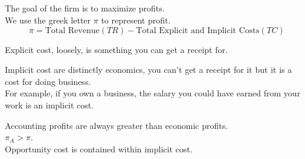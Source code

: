 \subsection{}
The goal of the firm is to maximize profits.\\
We use the greek letter $\pi$ to represent profit.
\begin{equation}
    \pi = \text{Total Revenue}(TR) - \text{Total Explicit and Implicit Costs}(TC)
\end{equation}
\begin{definition}
    Explicit cost, loosely, is something you can get a receipt for.
\end{definition}
\begin{definition}
    Implicit cost are distinctly economics, you can't get a receipt for it but it is a cost for doing business.\\
    For example, if you own a business, the salary you could have earned from your work is an implicit cost.
\end{definition}
Accounting profits are always greater than economic profits.\\
$\pi_A > \pi$.\\
Opportunity cost is contained within implicit cost.
